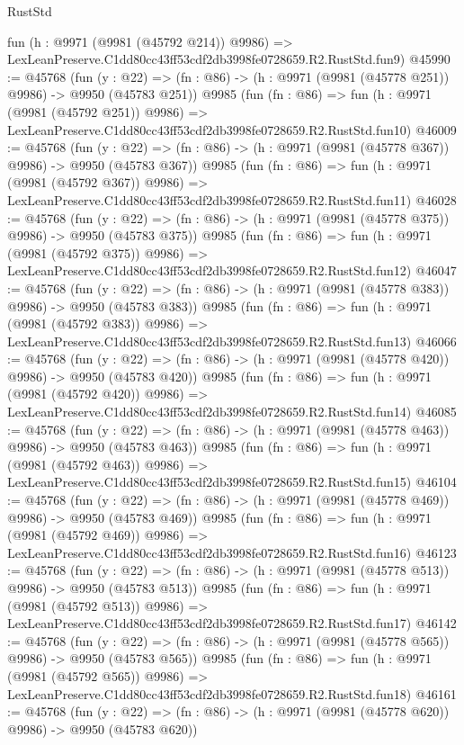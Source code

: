 \begin{lexlean}{RustStd}
\begin{coremodule}
    fun (h : @9971 (@9981 (@45792 @214)) @9986) =>
    LexLeanPreserve.C1dd80cc43ff53cdf2db3998fe0728659.R2.RustStd.fun9)
@45990 := @45768
    (fun (y : @22) => (fn : @86) -> (h : @9971 (@9981 (@45778 @251)) @9986) -> @9950 (@45783 @251))
    @9985
    (fun (fn : @86) =>
    fun (h : @9971 (@9981 (@45792 @251)) @9986) =>
    LexLeanPreserve.C1dd80cc43ff53cdf2db3998fe0728659.R2.RustStd.fun10)
@46009 := @45768
    (fun (y : @22) => (fn : @86) -> (h : @9971 (@9981 (@45778 @367)) @9986) -> @9950 (@45783 @367))
    @9985
    (fun (fn : @86) =>
    fun (h : @9971 (@9981 (@45792 @367)) @9986) =>
    LexLeanPreserve.C1dd80cc43ff53cdf2db3998fe0728659.R2.RustStd.fun11)
@46028 := @45768
    (fun (y : @22) => (fn : @86) -> (h : @9971 (@9981 (@45778 @375)) @9986) -> @9950 (@45783 @375))
    @9985
    (fun (fn : @86) =>
    fun (h : @9971 (@9981 (@45792 @375)) @9986) =>
    LexLeanPreserve.C1dd80cc43ff53cdf2db3998fe0728659.R2.RustStd.fun12)
@46047 := @45768
    (fun (y : @22) => (fn : @86) -> (h : @9971 (@9981 (@45778 @383)) @9986) -> @9950 (@45783 @383))
    @9985
    (fun (fn : @86) =>
    fun (h : @9971 (@9981 (@45792 @383)) @9986) =>
    LexLeanPreserve.C1dd80cc43ff53cdf2db3998fe0728659.R2.RustStd.fun13)
@46066 := @45768
    (fun (y : @22) => (fn : @86) -> (h : @9971 (@9981 (@45778 @420)) @9986) -> @9950 (@45783 @420))
    @9985
    (fun (fn : @86) =>
    fun (h : @9971 (@9981 (@45792 @420)) @9986) =>
    LexLeanPreserve.C1dd80cc43ff53cdf2db3998fe0728659.R2.RustStd.fun14)
@46085 := @45768
    (fun (y : @22) => (fn : @86) -> (h : @9971 (@9981 (@45778 @463)) @9986) -> @9950 (@45783 @463))
    @9985
    (fun (fn : @86) =>
    fun (h : @9971 (@9981 (@45792 @463)) @9986) =>
    LexLeanPreserve.C1dd80cc43ff53cdf2db3998fe0728659.R2.RustStd.fun15)
@46104 := @45768
    (fun (y : @22) => (fn : @86) -> (h : @9971 (@9981 (@45778 @469)) @9986) -> @9950 (@45783 @469))
    @9985
    (fun (fn : @86) =>
    fun (h : @9971 (@9981 (@45792 @469)) @9986) =>
    LexLeanPreserve.C1dd80cc43ff53cdf2db3998fe0728659.R2.RustStd.fun16)
@46123 := @45768
    (fun (y : @22) => (fn : @86) -> (h : @9971 (@9981 (@45778 @513)) @9986) -> @9950 (@45783 @513))
    @9985
    (fun (fn : @86) =>
    fun (h : @9971 (@9981 (@45792 @513)) @9986) =>
    LexLeanPreserve.C1dd80cc43ff53cdf2db3998fe0728659.R2.RustStd.fun17)
@46142 := @45768
    (fun (y : @22) => (fn : @86) -> (h : @9971 (@9981 (@45778 @565)) @9986) -> @9950 (@45783 @565))
    @9985
    (fun (fn : @86) =>
    fun (h : @9971 (@9981 (@45792 @565)) @9986) =>
    LexLeanPreserve.C1dd80cc43ff53cdf2db3998fe0728659.R2.RustStd.fun18)
@46161 := @45768
    (fun (y : @22) => (fn : @86) -> (h : @9971 (@9981 (@45778 @620)) @9986) -> @9950 (@45783 @620))

\end{coremodule}
\end{lexlean}
